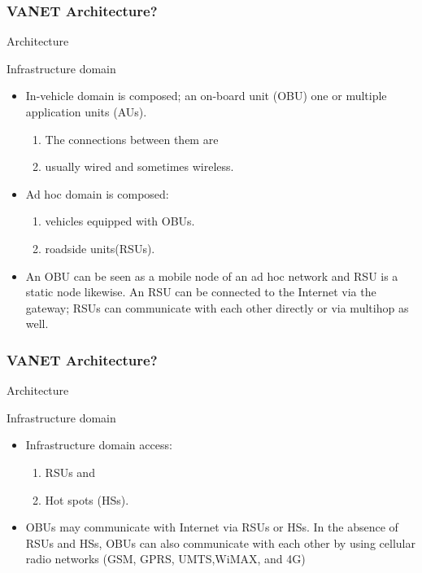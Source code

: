 \documentclass{beamer}
\begin{document}
\begin{frame}
	
	\frametitle{VANET Architecture?}
	\begin{block}{Architecture}
		\begin{block}{Infrastructure domain}
			\begin{itemize}
				\item In-vehicle domain is composed;
				an on-board unit (OBU) 
				one or multiple application units (AUs).
				\begin{enumerate}
				\item The connections between them are \item usually wired and sometimes wireless. 
				\end{enumerate}
				\item Ad hoc domain is composed:
				
				\begin{enumerate}
				\item vehicles equipped with OBUs.  
					 
					\item roadside units(RSUs).
				
					
				\end{enumerate}
				\item An OBU can be seen as a mobile node of an ad hoc network and RSU is a static node likewise. An RSU can be connected to the Internet via the gateway; RSUs can communicate with each other directly or via multihop as well.
				
				
			\end{itemize}
		\end{block}
	\end{block}
	
\end{frame}



\begin{frame}
	
	\frametitle{VANET Architecture?}
	\begin{block}{Architecture}
		\begin{block}{Infrastructure domain}
			\begin{itemize}
				\item Infrastructure domain access:
			\begin{enumerate}
				\item RSUs and 
				\item Hot spots (HSs). 
			\end{enumerate}
				
				
					\item OBUs may communicate with Internet via RSUs or HSs. In the absence of RSUs and HSs, OBUs can also communicate with each other by using cellular radio networks (GSM, GPRS, UMTS,WiMAX, and 4G)
					
				
				
			\end{itemize}
		\end{block}
	\end{block}
	
\end{frame}
\end{document}
